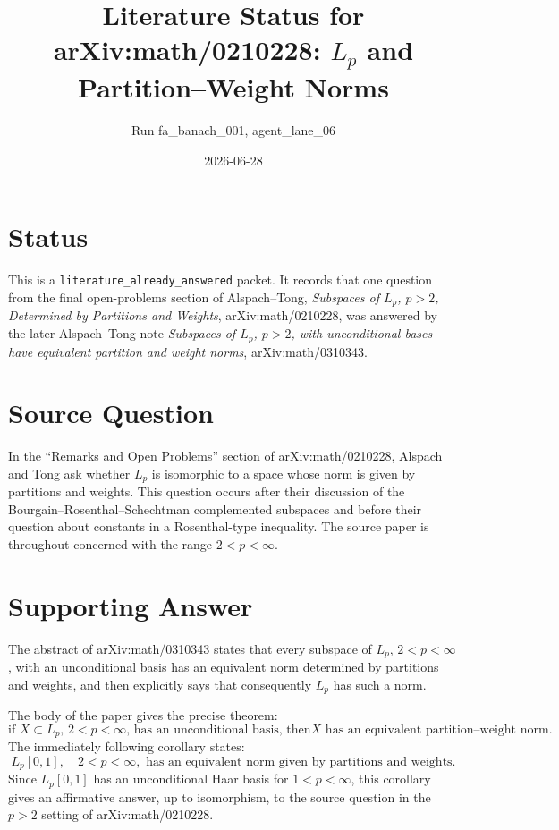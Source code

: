 \documentclass[11pt]{article}
\title{Literature Status for arXiv:math/0210228: \(L_p\) and Partition--Weight Norms}
\author{Run fa\_banach\_001, agent\_lane\_06}
\date{2026-06-28}
\begin{document}
\maketitle

\section*{Status}

This is a \texttt{literature\_already\_answered} packet.  It records that one
question from the final open-problems section of Alspach--Tong,
\emph{Subspaces of \(L_p\), \(p>2\), Determined by Partitions and Weights},
arXiv:math/0210228, was answered by the later Alspach--Tong note
\emph{Subspaces of \(L_p\), \(p>2\), with unconditional bases have equivalent
partition and weight norms}, arXiv:math/0310343.

\section*{Source Question}

In the ``Remarks and Open Problems'' section of arXiv:math/0210228,
Alspach and Tong ask whether \(L_p\) is isomorphic to a space whose norm is
given by partitions and weights.  This question occurs after their discussion
of the Bourgain--Rosenthal--Schechtman complemented subspaces and before their
question about constants in a Rosenthal-type inequality.  The source paper is
throughout concerned with the range \(2<p<\infty\).

\section*{Supporting Answer}

The abstract of arXiv:math/0310343 states that every subspace of \(L_p\),
\(2<p<\infty\), with an unconditional basis has an equivalent norm determined
by partitions and weights, and then explicitly says that consequently \(L_p\)
has such a norm.

The body of the paper gives the precise theorem:
\[
\text{if \(X\subset L_p\), \(2<p<\infty\), has an unconditional basis, then
\(X\) has an equivalent partition--weight norm.}
\]
The immediately following corollary states:
\[
L_p[0,1],\quad 2<p<\infty,
\text{ has an equivalent norm given by partitions and weights.}
\]
Since \(L_p[0,1]\) has an unconditional Haar basis for \(1<p<\infty\), this
corollary gives an affirmative answer, up to isomorphism, to the source
question in the \(p>2\) setting of arXiv:math/0210228.
\end{document}
